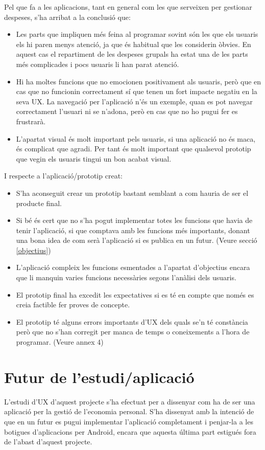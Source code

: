 Pel que fa a les aplicacions, tant en general com les que serveixen per gestionar despeses, s'ha arribat a la conclusió que:

\begin{itemize}
\item Les parts que impliquen més feina al programar sovint són les que els usuaris els hi paren menys atenció, ja que és habitual que les considerin òbvies. En aquest cas el repartiment de les despeses grupals ha estat una de les parts més complicades i pocs usuaris li han parat atenció.
\item Hi ha moltes funcions que no emocionen positivament als usuaris, però que en cas que no funcionin correctament sí que tenen un fort impacte negatiu en la seva \ac{UX}. La navegació per l'aplicació n'és un exemple, quan es pot navegar correctament l'usuari ni se n'adona, però en cas que no ho pugui fer es frustrarà.
\item L'apartat visual és molt important pels usuaris, si una aplicació no és maca, és complicat que agradi. Per tant és molt important que qualsevol prototip que vegin els usuaris tingui un bon acabat visual. 
\end{itemize}

I respecte a l'aplicació/prototip creat:

\begin{itemize}
\item S'ha aconseguit crear un prototip bastant semblant a com hauria de ser el producte final.
\item Si bé és cert que no s'ha pogut implementar totes les funcions que havia de tenir l'aplicació, si que comptava amb les funcions més importants, donant una bona idea de com serà l'aplicació si es publica en un futur. (Veure secció \ref{objectius})
\item L'aplicació compleix les funcions esmentades a l'apartat d'objectius encara que li manquin varies funcions necessàries segons l'anàlisi dels usuaris.
\item El prototip final ha excedit les expectatives si es té en compte que només es creia factible fer proves de concepte.
\item El prototip té alguns errors importants d'\ac{UX} dels quals se'n té constància però que no s'han corregit per manca de temps o coneixements a l'hora de programar. (Veure annex 4)
\end{itemize}

\section{Futur de l'estudi/aplicació}
L'estudi d'\ac{UX} d'aquest projecte s'ha efectuat per a dissenyar com ha de ser una aplicació per la gestió de l'economia personal. S'ha dissenyat amb la intenció de que en un futur es pugui implementar l'aplicació completament i penjar-la a les botigues d'aplicacions per \gls{Android}, encara que aquesta última part estigués fora de l'abast d'aquest projecte. 

